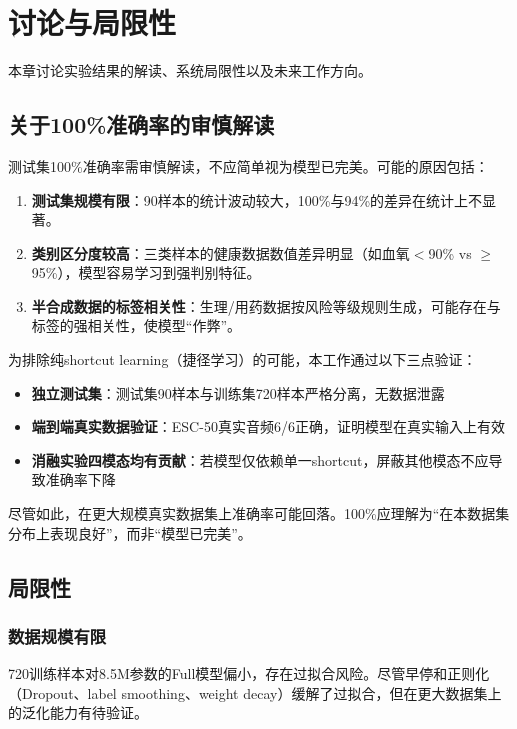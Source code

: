 \chapter{讨论与局限性}
\label{chap:discuss}

本章讨论实验结果的解读、系统局限性以及未来工作方向。

\section{关于100\%准确率的审慎解读}

测试集100\%准确率需审慎解读，不应简单视为模型已完美。可能的原因包括：

\begin{enumerate}
    \item \textbf{测试集规模有限}：90样本的统计波动较大，100\%与94\%的差异在统计上不显著。
    \item \textbf{类别区分度较高}：三类样本的健康数据数值差异明显（如血氧$<$90\% vs $\geq$95\%），模型容易学习到强判别特征。
    \item \textbf{半合成数据的标签相关性}：生理/用药数据按风险等级规则生成，可能存在与标签的强相关性，使模型``作弊''。
\end{enumerate}

为排除纯shortcut learning（捷径学习）的可能，本工作通过以下三点验证：

\begin{itemize}
    \item \textbf{独立测试集}：测试集90样本与训练集720样本严格分离，无数据泄露
    \item \textbf{端到端真实数据验证}：ESC-50真实音频6/6正确，证明模型在真实输入上有效
    \item \textbf{消融实验四模态均有贡献}：若模型仅依赖单一shortcut，屏蔽其他模态不应导致准确率下降
\end{itemize}

尽管如此，在更大规模真实数据集上准确率可能回落。100\%应理解为``在本数据集分布上表现良好''，而非``模型已完美''。

\section{局限性}

\subsection{数据规模有限}

720训练样本对8.5M参数的Full模型偏小，存在过拟合风险。尽管早停和正则化（Dropout、label smoothing、weight decay）缓解了过拟合，但在更大数据集上的泛化能力有待验证。

